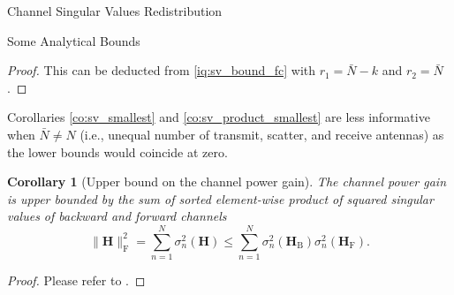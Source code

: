 \documentclass[journal]{IEEEtran}
\newtheorem{corollary}{Corollary}[proposition]
\begin{document}
\begin{section}{Channel Singular Values Redistribution}
\begin{subsection}{Some Analytical Bounds}
		\begin{proof}
			This can be deducted from \eqref{iq:sv_bound_fc} with $r_1 = \bar{N}-k$ and $r_2 = \bar{N}$.
		\end{proof}

		Corollaries \ref{co:sv_smallest} and \ref{co:sv_product_smallest} are less informative when $\bar{N} \ne N$ (i.e., unequal number of transmit, scatter, and receive antennas) as the lower bounds would coincide at zero.


		\begin{corollary}[Upper bound on the channel power gain\label{co:sum_power}]
			The channel power gain is upper bounded by the sum of sorted element-wise product of squared singular values of backward and forward channels
			\begin{equation}
				\lVert \mathbf{H} \rVert _\mathrm{F}^2 = \sum_{n=1}^N \sigma_n^2(\mathbf{H}) \le \sum_{n=1}^N \sigma_n^2(\mathbf{H}_\mathrm{B}) \sigma_n^2(\mathbf{H}_\mathrm{F}).
				\label{iq:power_gain}
			\end{equation}
		\end{corollary}

		\begin{proof}
			Please refer to \cite[Inequality~24.4.7]{Hogben2013}.
		\end{proof}


\end{subsection}
\end{section}
\end{document}
